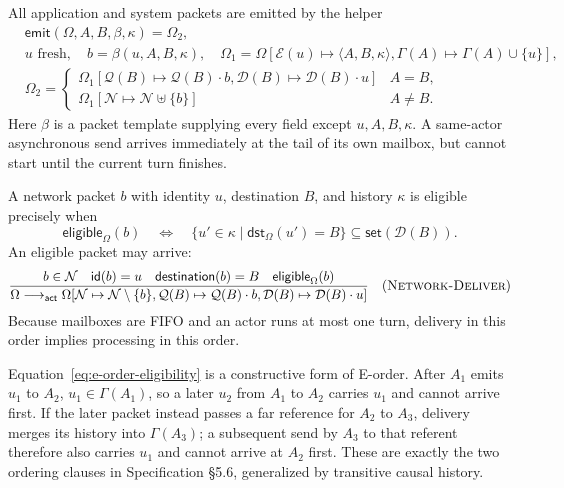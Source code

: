 All application and system packets are emitted by the helper
\begin{equation}\label{eq:emit-packet}
\begin{split}
 &\mathsf{emit}(\Omega,A,B,\beta,\kappa)=\Omega_2,\\
 &u\text{ fresh},\quad b=\beta(u,A,B,\kappa),\quad
 \Omega_1=\Omega[\mathcal E(u)\mapsto\langle A,B,\kappa\rangle,
                  \Gamma(A)\mapsto\Gamma(A)\cup\{u\}],\\
 &\Omega_2=
 \begin{cases}
  \Omega_1[\mathcal Q(B)\mapsto\mathcal Q(B)\cdot b,
           \mathcal D(B)\mapsto\mathcal D(B)\cdot u] & A=B,\\
  \Omega_1[\mathcal N\mapsto\mathcal N\uplus\{b\}] & A\ne B.
 \end{cases}
\end{split}
\end{equation}
Here $\beta$ is a packet template supplying every field except
$u,A,B,\kappa$.  A same-actor asynchronous send arrives immediately at the
tail of its own mailbox, but cannot start until the current turn finishes.

A network packet $b$ with identity $u$, destination $B$, and history $\kappa$
is eligible precisely when
\begin{equation}\label{eq:e-order-eligibility}
 \mathsf{eligible}_{\Omega}(b)\quad\Longleftrightarrow\quad
 \{u'\in\kappa\mid\mathsf{dst}_{\Omega}(u')=B\}
       \subseteq\mathsf{set}(\mathcal D(B)).
\end{equation}
An eligible packet may arrive:
\[
\dfrac{b\in\mathcal N\quad \mathsf{id}(b)=u\quad
       \mathsf{destination}(b)=B\quad
       \mathsf{eligible}_{\Omega}(b)}
 {\Omega\longrightarrow_{\mathsf{act}}
  \Omega[\mathcal N\mapsto\mathcal N\setminus\{b\},
         \mathcal Q(B)\mapsto\mathcal Q(B)\cdot b,
         \mathcal D(B)\mapsto\mathcal D(B)\cdot u]}
\quad(\textsc{Network-Deliver})
\]
Because mailboxes are FIFO and an actor runs at most one turn, delivery
in this order implies processing in this order.

Equation~\eqref{eq:e-order-eligibility} is a constructive form of E-order.
After $A_1$ emits $u_1$ to $A_2$, $u_1\in\Gamma(A_1)$, so a later $u_2$ from
$A_1$ to $A_2$ carries $u_1$ and cannot arrive first.  If the later packet
instead passes a far reference for $A_2$ to $A_3$, delivery merges its history
into $\Gamma(A_3)$; a subsequent send by $A_3$ to that referent therefore also
carries $u_1$ and cannot arrive at $A_2$ first.  These are exactly the two
ordering clauses in Specification \S5.6, generalized by transitive causal
history.

